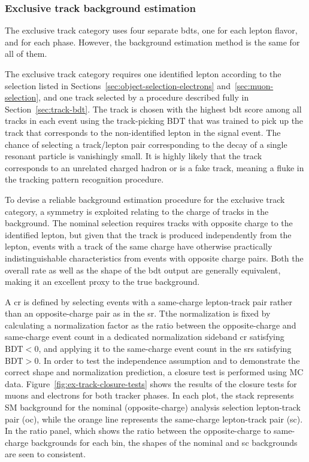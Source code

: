 \clearpage
\subsubsection{Exclusive track background estimation}
\label{sec:ex-track-background-estimation}

The exclusive track category uses four separate \glspl{bdt}, one for each lepton flavor, and for each phase. However, the background estimation method is the same for all of them.

The exclusive track category requires one identified lepton according to the selection listed in Sections~\ref{sec:object-selection-electrons} and~\ref{sec:muon-selection}, and one track selected by a procedure described fully in Section~\ref{sec:track-bdt}. The track is chosen with the highest \gls{bdt} score among all tracks in each event using the track-picking BDT that was trained to pick up the track that corresponds to the non-identified lepton in the signal event. The chance of selecting a track/lepton pair corresponding to the decay of a single resonant particle is vanishingly small. It is highly likely that the track corresponds to an unrelated charged hadron or is a fake track, meaning a fluke in the tracking pattern recognition procedure.

To devise a reliable background estimation procedure for the exclusive track category, a symmetry is exploited relating to the charge of tracks in the background. The nominal selection requires tracks with opposite charge to the identified lepton, but given that the track is produced independently from the lepton, events with a track of the same charge have otherwise practically indistinguishable characteristics from events with opposite charge pairs. Both the overall rate as well as the shape of the \gls{bdt} output are generally equivalent, making it an excellent proxy to the true background.

A \gls{cr} is defined by selecting events with a same-charge lepton-track pair rather than an opposite-charge pair as in the \gls{sr}. Tthe normalization is fixed by calculating a normalization factor as the ratio between the opposite-charge and same-charge event count in a dedicated normalization sideband \gls{cr} satisfying $\text{BDT} < 0$, and applying it to the same-charge event count in the \glspl{sr} satisfying $\text{BDT} > 0$. In order to test the independence assumption and to demonstrate the correct shape and normalization prediction, a closure test is performed using MC data. Figure~\ref{fig:ex-track-closure-tests} shows the results of the closure tests for muons and electrons for both tracker phases. In each plot, the stack represents SM background for the nominal (opposite-charge) analysis selection lepton-track pair (oc), while the orange line represents the same-charge lepton-track pair (sc). In the ratio panel, which shows the ratio between the opposite-charge to same-charge backgrounds for each bin, the shapes of the nominal and sc backgrounds are seen to consistent.

